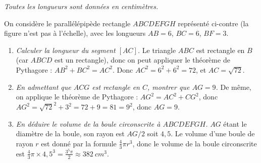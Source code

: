 \documentclass[11pt]{article}
\begin{document}
\begin{exercice}[Boule]\emph{Toutes les longueurs sont données en centimètres.}

  \begin{multicols}{2}
    \noindent On considère le parallélépipède rectangle $ABCDEFGH$ représenté ci-contre (la figure n'est pas à l'échelle), avec les longueurs $AB=6$, $BC=6$, $BF=3$.

  \begin{center}

\end{center}
\end{multicols}

\begin{enumerate}
  \item \emph{Calculer la longueur du segment $[AC]$.} Le triangle $ABC$ est rectangle en $B$ (car $ABCD$ est un rectangle), donc on peut appliquer le théorème de Pythagore : $AB^2+BC^2=AC^2$. Donc $AC^2=6^2+6^2=72$, et $AC=\sqrt{72}$.
  \item \emph{En admettant que $ACG$ est rectangle en $C$, montrer que $AG=9$.} De même, on applique le théorème de Pythagore : $AG^2=AC^2+CG^2$, donc $AG^2=\sqrt{72}^2+3^2=72+9=81=9^2$, donc $AG=9$.
  \item \emph{En déduire le volume de la boule circonscrite à $ABCDEFGH$.} $AG$ étant le diamètre de la boule, son rayon est $AG/2$ soit $4,5$. Le volume d'une boule de rayon $r$ est donné par la formule $\frac{4}{3}\pi r^3$, donc le volume de la boule circonscrite est $\frac{4}{3}\pi\times4,5^3=\frac{3^5\pi}{2}\approx382~cm^3$.
\end{enumerate}
\end{exercice}
\end{document}
